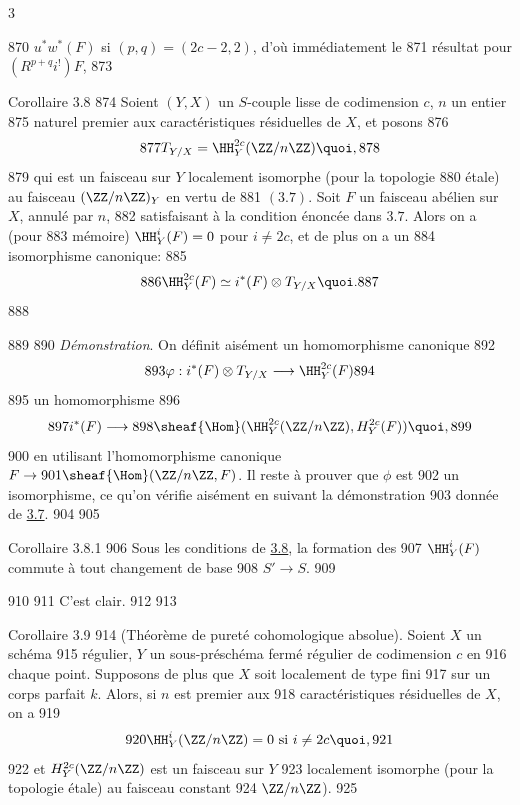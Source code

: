 3	\documentclass[10pt]{../fichiers-configuration-latex/smfart}
\begin{document}
   870	$u^{\ast}w^{\ast}(F)$ si $(p,q)=(2c-2,2)$, d'où immédiatement le
   871	résultat pour $(R^{p+q}i^{!})F$, 	
   873	\begin{enonce*}{Corollaire 3.8}
   874	Soient $(Y,X)$ un $S$-couple lisse de codimension $c$, $n$ un entier
   875	naturel premier aux caractéristiques résiduelles de $X$, et posons
   876	$$
   877	T_{Y/X}=\HH^{2c}_Y(\ZZ/n\ZZ){\quoi},
   878	$$
   879	qui est un faisceau sur $Y$ localement isomorphe (pour la topologie
   880	étale) au faisceau $(\ZZ/n\ZZ)_Y$ en vertu de
   881	$(3.7)$. Soit $F$ un faisceau abélien sur $X$, annulé par $n$,
   882	satisfaisant à la condition énoncée dans $3.7$. Alors on a (pour
   883	mémoire) $\HH^{i}_Y(F)=0$ pour $i\neq 2c$, et de plus on a un
   884	isomorphisme canonique:
   885	$$
   886	\HH^{2c}_Y(F)\simeq i^{\ast}(F)\otimes T_{Y/X}{\quoi}.
   887	$$
   888	\end{enonce*}
   889	
   890		\emph{Démonstration}. On définit aisément un homomorphisme canonique
   892	$$
   893	\varphi:i^{\ast}(F)\otimes T_{Y/X}\longrightarrow \HH^{2c}_Y(F)
   894	$$
   895	\ie un homomorphisme
   896	$$
   897	i^{\ast}(F)\longrightarrow
   898	\sheaf{\Hom}(\HH^{2c}_Y(\ZZ/n\ZZ),H^{2c}_Y(F)){\quoi},
   899	$$
   900	en utilisant l'homomorphisme canonique $F\rightarrow
   901	\sheaf{\Hom}(\ZZ/n\ZZ,F)$. Il reste à prouver que $\phi$ est
   902	un isomorphisme, ce qu'on vérifie aisément en suivant la démonstration
   903	donnée de \hyperref[XVI.thm3.7]{3.7}.
   904	
   905	\begin{enonce*}{Corollaire 3.8.1}
   906	Sous les conditions de \hyperref[XVI.cor3.8]{3.8}, la formation des
   907	$\HH^{i}_Y(F)$\pageoriginale commute à tout changement de base
   908	$S'\rightarrow S$.
   909	\end{enonce*}
   910	
   911	C'est clair.
   912	
   913	\begin{enonce*}{Corollaire 3.9}
   914	(Théorème de pureté cohomologique absolue). Soient $X$ un schéma
   915	régulier, $Y$ un sous-préschéma fermé régulier de codimension $c$ en
   916	chaque point. Supposons de plus que $X$ soit localement de type fini
   917	sur un corps parfait $k$. Alors, si $n$ est premier aux
   918	caractéristiques résiduelles de $X$, on a
   919	$$
   920	\HH^{i}_Y(\ZZ/n\ZZ)=0\mbox{ si } i\neq 2c{\quoi},
   921	$$
   922	et $H^{2c}_Y(\ZZ/n\ZZ)$ est un faisceau sur $Y$
   923	localement isomorphe (pour la topologie étale) au faisceau constant
   924	$\ZZ/n\ZZ$). 
   925	\end{enonce*}
\end{document}
